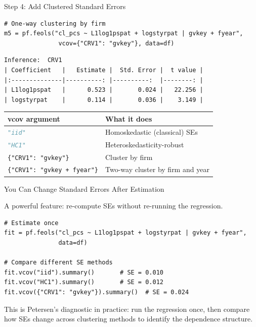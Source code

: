 \documentclass[9pt,aspectratio=169]{beamer}
\newcommand{\py}[1]{\lstinline[language=Python]{#1}}
\begin{document}
\begin{frame}[fragile]{Step 4: Add Clustered Standard Errors}

\begin{lstlisting}[basicstyle=\ttfamily\scriptsize]
# One-way clustering by firm
m5 = pf.feols("cl_pcs ~ L1log1pspat + logstyrpat | gvkey + fyear",
               vcov={"CRV1": "gvkey"}, data=df)
\end{lstlisting}

\begin{lstlisting}[style=output, basicstyle=\ttfamily\scriptsize]
Inference:  CRV1
| Coefficient   |   Estimate |  Std. Error |  t value |
|:--------------|----------: |----------:  |--------: |
| L1log1pspat   |      0.523 |       0.024 |   22.256 |
| logstyrpat    |      0.114 |       0.036 |    3.149 |
\end{lstlisting}

\medskip

\begin{tabular}{@{}lp{6cm}@{}}
\toprule
\textbf{vcov argument} & \textbf{What it does} \\
\midrule
\py{"iid"} & Homoskedastic (classical) SEs \\[0.2em]
\py{"HC1"} & Heteroskedasticity-robust \\[0.2em]
\texttt{\{"CRV1": "gvkey"\}} & Cluster by firm \\[0.2em]
\texttt{\{"CRV1": "gvkey + fyear"\}} & Two-way cluster by firm and year \\
\bottomrule
\end{tabular}

\end{frame}


\begin{frame}[fragile]{You Can Change Standard Errors After Estimation}

A powerful feature: re-compute SEs without re-running the regression.

\begin{lstlisting}
# Estimate once
fit = pf.feols("cl_pcs ~ L1log1pspat + logstyrpat | gvkey + fyear",
               data=df)

# Compare different SE methods
fit.vcov("iid").summary()       # SE = 0.010
fit.vcov("HC1").summary()       # SE = 0.012
fit.vcov({"CRV1": "gvkey"}).summary()  # SE = 0.024
\end{lstlisting}

\medskip

\begin{highlightbox}
\centering
This is Petersen's diagnostic in practice: run the regression once, then compare how SEs change across clustering methods to identify the dependence structure.
\end{highlightbox}

\end{frame}
\end{document}
